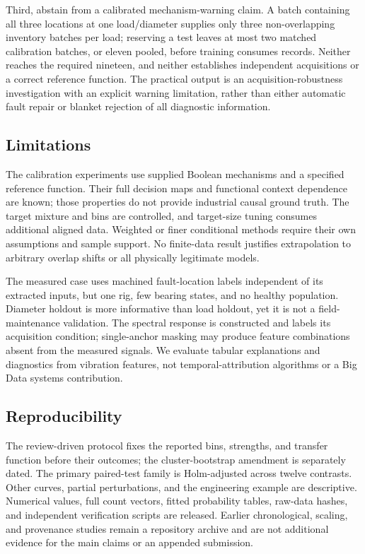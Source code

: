\documentclass[conference]{IEEEtran}
\begin{document}
Third, abstain from a calibrated mechanism-warning claim. A batch containing all three locations at one load/diameter supplies only three non-overlapping inventory batches per load; reserving a test leaves at most two matched calibration batches, or eleven pooled, before training consumes records. Neither reaches the required nineteen, and neither establishes independent acquisitions or a correct reference function. The practical output is an acquisition-robustness investigation with an explicit warning limitation, rather than either automatic fault repair or blanket rejection of all diagnostic information.

\subsection{Limitations}
The calibration experiments use supplied Boolean mechanisms and a specified reference function. Their full decision maps and functional context dependence are known; those properties do not provide industrial causal ground truth. The target mixture and bins are controlled, and target-size tuning consumes additional aligned data. Weighted or finer conditional methods require their own assumptions and sample support. No finite-data result justifies extrapolation to arbitrary overlap shifts or all physically legitimate models.

The measured case uses machined fault-location labels independent of its extracted inputs, but one rig, few bearing states, and no healthy population. Diameter holdout is more informative than load holdout, yet it is not a field-maintenance validation. The spectral response is constructed and labels its acquisition condition; single-anchor masking may produce feature combinations absent from the measured signals. We evaluate tabular explanations and diagnostics from vibration features, not temporal-attribution algorithms or a Big Data systems contribution.

\subsection{Reproducibility}
The review-driven protocol fixes the reported bins, strengths, and transfer function before their outcomes; the cluster-bootstrap amendment is separately dated. The primary paired-test family is Holm-adjusted across twelve contrasts. Other curves, partial perturbations, and the engineering example are descriptive. Numerical values, full count vectors, fitted probability tables, raw-data hashes, and independent verification scripts are released. Earlier chronological, scaling, and provenance studies remain a repository archive and are not additional evidence for the main claims or an appended submission.
\end{document}
